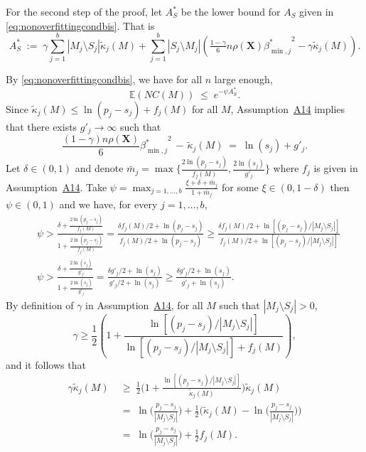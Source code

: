 \documentclass[bj,authoryear]{imsart}
\theoremstyle{plain}
\newcommand{\E}{\mathbb{E}}
\newcommand{\bs}{\boldsymbol}
\begin{document}
For the second step of the proof, let $A_S^*$ be the lower bound for $A_S$ given in \eqref{eq:nonoverfittingcondbis}. That is 
$$A_S^*\;:=\;\gamma\sum_{j=1}^b|M_j \setminus S_j|\tilde{\kappa}_j(M) + \sum_{j=1}^b |S_j\setminus M_j |\left(\tfrac{1-\gamma}{6} n \rho(\bs X) {\beta^*_{\min,j}}^{2} - \gamma\tilde{\kappa}_j(M)\right).$$

By \eqref{eq:nonoverfittingcondbis}, we have for all $n$ large enough,
\begin{equation}\label{eq:boundexpbis}
    \E(NC(M))\;\leq\;e^{-\psi A_S^*}.
\end{equation}
Since $\tilde{\kappa}_j(M) \leq \ln(p_j-s_j)+f_j(M)$ for all $M$, Assumption~\hyperlink{lab:A14}{A14} implies that there exists $g'_j \to \infty$ such that
\begin{equation}\label{eq:ogbeabis}
    \frac{(1-\gamma) n\rho(\bs X)}{6}{\beta_{\min,j}^*}^2 \,- \,\tilde{\kappa}_j(M) \;=\; \ln(s_j) + g'_{j}.
\end{equation}
Let $\delta \in (0,1)$ and denote $\bar{m}_j=\max\big\{\frac{2\ln(p_j-s_j)}{f_j(M)},\frac{2\ln(s_j)}{g'_{j}}\big\}$ where $f_j$ is given in Assumption~\hyperlink{lab:A14}{A14}. 
Take $\psi=\max_{j=1,\ldots,b}\frac{\xi + \delta + \bar{m}_j}{1+\bar{m}_j}$ for some $\xi \in(0, 1- \delta)$ then $\psi \in (0,1)$ and we have, for every $j=1,\ldots,b$,
\begin{align}
    &\psi > \frac{\delta + \frac{2\ln(p_j-s_j)}{f_j(M)}}{1+\frac{2\ln(p_j-s_j)}{f_j(M)}} = \frac{\delta f_j(M)/2 + \ln(p_j-s_j)}{f_j(M)/2 +\ln(p_j-s_j)} \geq \frac{\delta f_j(M)/2 + \ln[(p_j-s_j)/|M_j\setminus S_j|]}{f_j(M)/2 +\ln[(p_j-s_j)/|M_j\setminus S_j|]}\label{eq:psifbis}\\
    &\psi > \frac{\delta + \frac{2\ln(s_j)}{g'_j}}{1+\frac{2\ln(s_j)}{g'_j}} = \frac{\delta g'_j/2 + \ln(s_j)}{g'_j/2 +\ln(s_j)} \geq \frac{\delta g'_j/2 + \ln(s_j)}{g'_j +\ln(s_j)}.\label{eq:psigbis}
\end{align}
By definition of $\gamma$ in Assumption~\hyperlink{lab:A14}{A14}, for all $M$ such that $|M_j\setminus S_j|>0$, $$\gamma \geq \frac12(1+ \frac{\ln[(p_j-s_j)/|M_j\setminus S_j|]}{\ln[(p_j-s_j)/|M_j\setminus S_j|] + f_j(M)}),$$ and it follows that 
\begin{align*}
    \gamma\tilde{\kappa}_j(M)
    &\;\geq\;\frac12 \Big(1+\frac{\ln[(p_j-s_j)/|M_j\setminus S_j|]}{\tilde{\kappa}_j(M)}\Big)\tilde{\kappa}_j(M)\\
    &\;=\;\ln\Big(\frac{p_j-s_j}{|M_j\setminus S_j|}\Big)+\frac12\Big(\tilde{\kappa}_j(M)-\ln\Big(\frac{p_j-s_j}{|M_j\setminus S_j|}\Big)\Big)\\
    & \;=\; \ln\Big(\frac{p_j-s_j}{|M_j\setminus S_j|}\Big)+ \frac12f_j(M).
\end{align*}
\end{document}
